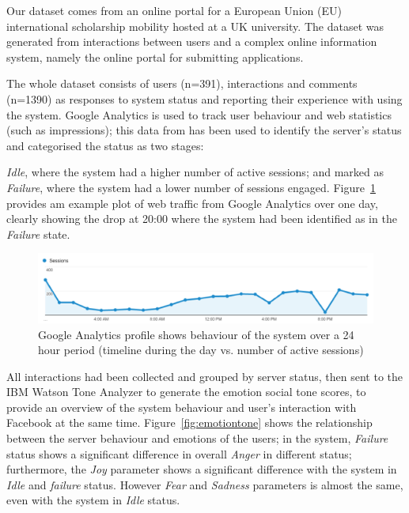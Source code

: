 \documentclass[graybox]{svmult}
\begin{document}
Our dataset comes from an online portal for a European Union (EU)
international scholarship mobility hosted at a UK university. The
dataset was generated from interactions between users and a complex
online information system, namely the online portal for submitting
applications.

The whole dataset consists of users (n=391), interactions and comments
(n=1390) as responses to system status and reporting their experience
with using the system. Google Analytics is used to track user behaviour
and web statistics (such as impressions); this data from has been used
to identify the server's status and categorised the status as two
stages: {\emph{Idle}, where the system had a higher number of active
sessions; and marked as {\emph{Failure}}, where the system had a lower
number of sessions engaged. Figure~\ref{fig:googleanalytics} provides
am example plot of web traffic from Google Analytics over one day, clearly
showing the drop at 20:00 where the system had been identified as in
the {\emph{Failure}} state.

\begin{figure}[!ht]
\centering
\includegraphics[width=\columnwidth]{images/googleanalytics}
\caption{Google Analytics profile shows behaviour of the system over a
  24 hour period (timeline during the day vs. number of active sessions)}
\label{fig:googleanalytics} 
\end{figure}

All interactions had been collected and grouped by server status, then
sent to the IBM Watson Tone Analyzer to generate the emotion social
tone scores, to provide an overview of the system behaviour and user’s
interaction with Facebook at the same
time. Figure~\ref{fig:emotiontone} shows the relationship between the
server behaviour and emotions of the users; in the system,
{\emph{Failure}} status shows a significant difference in overall
{\emph{Anger}} in different status; furthermore, the {\emph{Joy}}
parameter shows a significant difference with the system in
{\emph{Idle}} and {\emph{failure}} status. However {\emph{Fear}} and
{\emph{Sadness}} parameters is almost the same, even with the system in
{\emph{Idle}} status.

}
\end{document}
